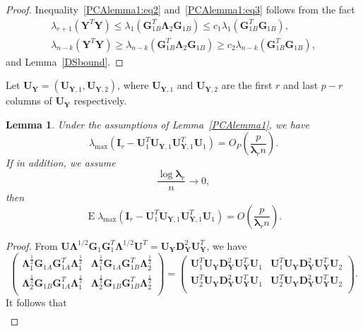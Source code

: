 \documentclass[12pt]{article} %
\DeclareMathOperator{\myE}{E}
\newcommand{\bY}{\mathbf{Y}}
\newcommand{\bG}{\mathbf{G}}
\newcommand{\bI}{\mathbf{I}}
\newcommand{\bU}{\mathbf{U}}
\newcommand{\bD}{\mathbf{D}}
\newcommand{\bfsym}[1]{\ensuremath{\boldsymbol{#1}}}
\def\blambda {\bfsym {\lambda}}
\def\bLambda {\bfsym {\Lambda}}
\newtheorem{lemma}{Lemma}
\theoremstyle{definition}
\begin{document}
\begin{appendices}
\begin{proof}
Inequality~\eqref{PCAlemma1:eq2} and~\eqref{PCAlemma1:eq3} follows from  the fact
\begin{align*}
\lambda_{r+1}(\bY^T \bY)\leq \lambda_1(\bG_{1B}^T \bLambda_2 \bG_{1B})\leq c_1 \lambda_1(\bG_{1B}^T \bG_{1B}),\\
    \lambda_{n-k}(\bY^T \bY)\geq \lambda_{n-k}(\bG_{1B}^T \bLambda_2 \bG_{1B})\geq c_2 \lambda_{n-k}(\bG_{1B}^T \bG_{1B}),
\end{align*}
and Lemma~\ref{DSbound}.
\end{proof}


Let $\bU_\bY=(\bU_{\bY,1},\bU_{\bY,2})$, where $\bU_{\bY,1}$ and $\bU_{\bY,2}$ are the first $r$ and last $p-r$ columns of $\bU_\bY$ respectively.
\begin{lemma}\label{PCAlemma2}
    Under the assumptions of Lemma~\ref{PCAlemma1}, we have
$$
\lambda_{\max}(\bI_r-\bU_1^T \bU_{\bY,1}\bU_{\bY,1}^T \bU_1)
=O_P(\frac{ p}{\blambda_r n}).
$$
If in addition, we assume
    \begin{equation}\label{newCondition}
        \frac{\log \blambda_r}{n}\to 0,
    \end{equation}
     then
$$
\myE\lambda_{\max}(\bI_r-\bU_1^T \bU_{\bY,1}\bU_{\bY,1}^T \bU_1)
=O(\frac{ p}{\blambda_r n}).
$$
\end{lemma}
\begin{proof}
    From
$
\bU\bLambda^{1/2} \bG_1 \bG_1^T \bLambda^{1/2} \bU^T 
=\bU_{\bY}\bD_{\bY}^2 \bU_{\bY}^T
$,
we have
$$
    \begin{pmatrix}        
        \bLambda_{1}^{\frac{1}{2}}\bG_{1A} \bG_{1A}^T \bLambda_1^{\frac{1}{2}}&
        \bLambda_{1}^{\frac{1}{2}} \bG_{1A}\bG_{1B}^T\bLambda_2^{\frac{1}{2}}\\
        \bLambda_{2}^{\frac{1}{2}} \bG_{1B} \bG_{1A}^T\bLambda_1^{\frac{1}{2}} &
        \bLambda_{2}^{\frac{1}{2}}\bG_{1B}\bG_{1B}^T\bLambda_2^{\frac{1}{2}}\\
    \end{pmatrix}
    =
    \begin{pmatrix}        
         \bU_1^T \bU_{\bY}\bD_{\bY}^2 \bU_{\bY}^T \bU_1&
         \bU_1^T \bU_{\bY}\bD_{\bY}^2 \bU_{\bY}^T \bU_2\\
        \bU_2^T \bU_{\bY}\bD_{\bY}^2 \bU_{\bY}^T \bU_1&
         \bU_2^T \bU_{\bY}\bD_{\bY}^2 \bU_{\bY}^T \bU_2\\
    \end{pmatrix}.
$$
It follows that
$$
\begin{aligned}

\end{aligned}$$
\end{proof}
\end{appendices}
\end{document}
